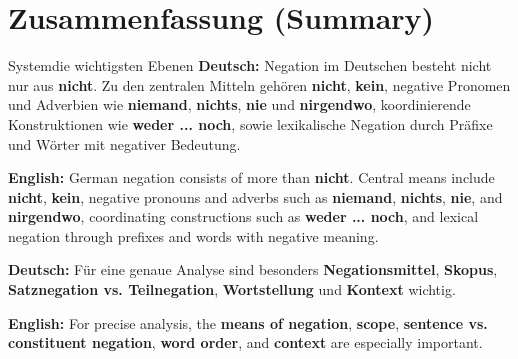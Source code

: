 \documentclass[a4paper,11pt]{article}
\newcommand{\GermanText}[1]{\textbf{Deutsch: }#1\par}
\newcommand{\EnglishText}[1]{{\small\color{SoftGray}\textbf{English: }#1\par}}
\begin{document}
\section{Zusammenfassung \textnormal{(Summary)}}
\begin{grammarentry}{System}{die wichtigsten Ebenen}
\GermanText{Negation im Deutschen besteht nicht nur aus \textbf{nicht}. Zu den zentralen Mitteln gehören \textbf{nicht}, \textbf{kein}, negative Pronomen und Adverbien wie \textbf{niemand}, \textbf{nichts}, \textbf{nie} und \textbf{nirgendwo}, koordinierende Konstruktionen wie \textbf{weder ... noch}, sowie lexikalische Negation durch Präfixe und Wörter mit negativer Bedeutung.}
\EnglishText{German negation consists of more than \textbf{nicht}. Central means include \textbf{nicht}, \textbf{kein}, negative pronouns and adverbs such as \textbf{niemand}, \textbf{nichts}, \textbf{nie}, and \textbf{nirgendwo}, coordinating constructions such as \textbf{weder ... noch}, and lexical negation through prefixes and words with negative meaning.}
\GermanText{Für eine genaue Analyse sind besonders \textbf{Negationsmittel}, \textbf{Skopus}, \textbf{Satznegation vs. Teilnegation}, \textbf{Wortstellung} und \textbf{Kontext} wichtig.}
\EnglishText{For precise analysis, the \textbf{means of negation}, \textbf{scope}, \textbf{sentence vs. constituent negation}, \textbf{word order}, and \textbf{context} are especially important.}
\end{grammarentry}
\end{document}

